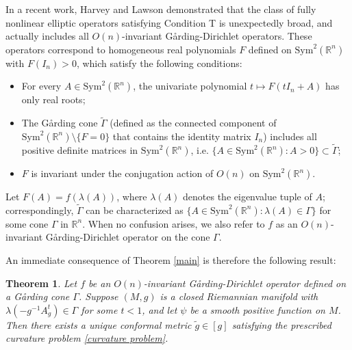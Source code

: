 \documentclass{article}
\theoremstyle{plain}
\newtheorem{theorem}{Theorem}[section]
\theoremstyle{definition}
\theoremstyle{definition}
\numberwithin{equation}{section}
\begin{document}
\begin{sloppypar}
In a recent work, Harvey and Lawson \cite{HL23} demonstrated that the class of fully nonlinear elliptic operators satisfying Condition T is unexpectedly broad, and actually includes all $O(n)$-invariant G\r{a}rding-Dirichlet operators. These operators correspond to homogeneous real polynomials $F$ defined on $\mathrm{Sym}^{2}(\mathbb{R}^n)$ with $F(I_{n})>0$, which satisfy the following conditions:
\begin{itemize}
\item[(i)] For every $A\in \mathrm{Sym}^{2}(\mathbb{R}^n)$,  the univariate polynomial 
 $t\mapsto F(tI_{n}+A)$ has only real roots;
\item[(ii)] The G\r{a}rding cone $\widetilde{{\Gamma}}$ (defined as the connected component of $\mathrm{Sym}^{2}(\mathbb{R}^n)\setminus \{F=0\}$ that contains the identity matrix $I_{n}$) includes all positive definite matrices in $\mathrm{Sym}^{2}(\mathbb{R}^n)$, i.e. $ \{A\in \mathrm{Sym}^{2}(\mathbb{R}^n): A>0\} \subset  \widetilde{{\Gamma}}$;
\item[(iii)] $F$ is invariant under the conjugation action of $O(n)$ on $\mathrm{Sym}^{2}(\mathbb{R}^n)$.
\end{itemize}
Let $F(A)=f(\lambda(A))$, where $\lambda(A)$ denotes the eigenvalue tuple of $A$; correspondingly, $\widetilde{{\Gamma}}$ can be characterized as $\{A\in \mathrm{Sym}^{2}(\mathbb{R}^n): \lambda(A)\in \Gamma\}$ for some cone $\Gamma$ in $\mathbb{R}^n$. When no confusion arises, we also refer to $f$ as an $O(n)$-invariant G\r{a}rding-Dirichlet operator on the cone $\Gamma$.\medskip

An immediate consequence of Theorem \ref{main} is therefore the following result:
\begin{theorem}\label{GD}
Let $f$ be an $O(n)$-invariant G\r{a}rding-Dirichlet operator defined on a G\r{a}rding cone $\Gamma$. Suppose $(M,g)$ is a closed Riemannian manifold with $\lambda(-g^{-1}A_{g}^{t})\in \Gamma$ for some $t<1$, and let $\psi$ be a smooth positive function on $M$. Then there exists a unique conformal metric $\tilde{g}\in [g]$ satisfying the prescribed curvature problem \eqref{curvature problem}.
\end{theorem}


\end{sloppypar}
\end{document}
